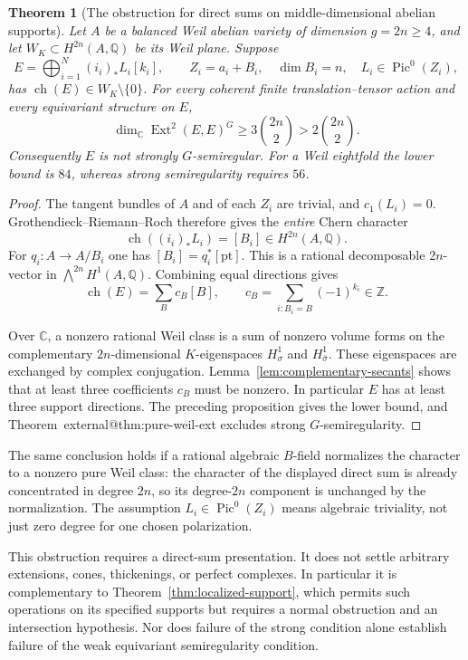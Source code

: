 \documentclass[11pt]{article}
\makeatletter
\providecommand{\compref}[1]{\csname external@#1\endcsname}
\newtheorem{theorem}{Theorem}[section]
\theoremstyle{definition}
\theoremstyle{remark}
\makeatother
\begin{document}
\begin{theorem}[The obstruction for direct sums on middle-dimensional
abelian supports]\label{thm:subtorus-direct-sums}
Let $A$ be a balanced Weil abelian variety of dimension $g=2n\geq4$,
and let $W_K\subset H^{2n}(A,\mathbb Q)$ be its Weil plane.
Suppose
\[
 E=\bigoplus_{i=1}^N(i_i)_*L_i[k_i],
 \qquad Z_i=a_i+B_i,\quad \dim B_i=n,
 \quad L_i\in\operatorname{Pic}^0(Z_i),
\]
has $\operatorname{ch}(E)\in W_K\setminus\{0\}$.
For every coherent finite translation--tensor action and every
equivariant structure on $E$,
\[
 \dim_{\mathbb C}\operatorname{Ext}^2(E,E)^G
       \geq3\binom{2n}{2}>2\binom{2n}{2}.
\]
Consequently $E$ is not strongly $G$-semiregular.
For a Weil eightfold the lower bound is $84$, whereas strong
semiregularity requires $56$.
\end{theorem}

\begin{proof}
The tangent bundles of $A$ and of each $Z_i$ are trivial, and
$c_1(L_i)=0$.  Grothendieck--Riemann--Roch therefore gives the
\emph{entire} Chern character
\[
 \operatorname{ch}((i_i)_*L_i)=[B_i]\in H^{2n}(A,\mathbb Q).
\]
For $q_i:A\longrightarrow A/B_i$ one has
$[B_i]=q_i^*[\mathrm{pt}]$.  This is a rational decomposable
$2n$-vector in $\bigwedge^{2n}H^1(A,\mathbb Q)$.
Combining equal directions gives
\[
 \operatorname{ch}(E)=\sum_B c_B[B],\qquad
 c_B=\sum_{i:B_i=B}(-1)^{k_i}\in\mathbb Z.
\]

Over $\mathbb C$, a nonzero rational Weil class is a sum of
nonzero volume forms on the complementary $2n$-dimensional
$K$-eigenspaces $H^1_\sigma$ and $H^1_{\bar\sigma}$.  These
eigenspaces are exchanged by complex conjugation.
Lemma~\ref{lem:complementary-secants} shows that at least three
coefficients $c_B$ must be nonzero.  In particular $E$ has at
least three support directions.  The preceding proposition gives
the lower bound, and Theorem~\compref{thm:pure-weil-ext} excludes
strong $G$-semiregularity.
\end{proof}

The same conclusion holds if a rational algebraic $B$-field
normalizes the character to a nonzero pure Weil class: the
character of the displayed direct sum is already concentrated in
degree $2n$, so its degree-$2n$ component is unchanged by the
normalization.  The assumption $L_i\in\operatorname{Pic}^0(Z_i)$
means algebraic triviality, not just zero degree for one chosen
polarization.

This obstruction requires a direct-sum presentation.  It does not
settle arbitrary extensions, cones, thickenings, or perfect
complexes.  In particular it is complementary to
Theorem~\ref{thm:localized-support}, which permits such operations
on its specified supports but requires a normal obstruction and
an intersection hypothesis.  Nor does failure of the strong
condition alone establish failure of the weak equivariant
semiregularity condition.
\end{document}
